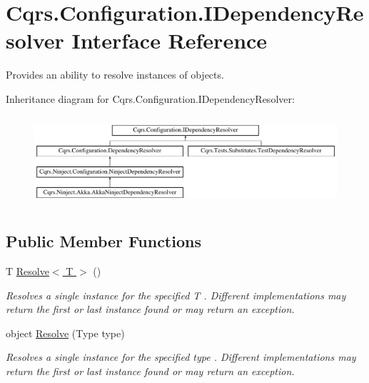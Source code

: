 \hypertarget{interfaceCqrs_1_1Configuration_1_1IDependencyResolver}{}\section{Cqrs.\+Configuration.\+I\+Dependency\+Resolver Interface Reference}
\label{interfaceCqrs_1_1Configuration_1_1IDependencyResolver}


Provides an ability to resolve instances of objects.  


Inheritance diagram for Cqrs.\+Configuration.\+I\+Dependency\+Resolver\+:\begin{figure}[H]
\begin{center}
\leavevmode
\includegraphics[height=3.353293cm]{interfaceCqrs_1_1Configuration_1_1IDependencyResolver}
\end{center}
\end{figure}
\subsection*{Public Member Functions}
\begin{DoxyCompactItemize}
\item 
T \hyperlink{interfaceCqrs_1_1Configuration_1_1IDependencyResolver_a9dc7694a365209a5ef05270a7cfa7b6b_a9dc7694a365209a5ef05270a7cfa7b6b}{Resolve$<$ T $>$} ()
\begin{DoxyCompactList}\small\item\em Resolves a single instance for the specified {\itshape T} . Different implementations may return the first or last instance found or may return an exception. \end{DoxyCompactList}\item 
object \hyperlink{interfaceCqrs_1_1Configuration_1_1IDependencyResolver_aa455096b7b94fc1d64904bc67830ec06_aa455096b7b94fc1d64904bc67830ec06}{Resolve} (Type type)
\begin{DoxyCompactList}\small\item\em Resolves a single instance for the specified {\itshape type} . Different implementations may return the first or last instance found or may return an exception. \end{DoxyCompactList}\end{DoxyCompactItemize}



